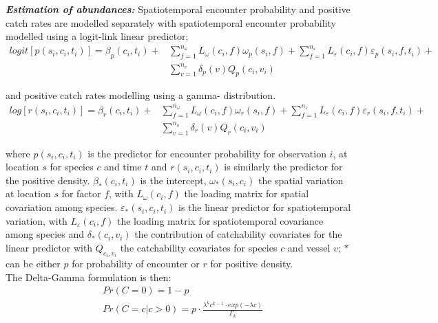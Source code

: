 \documentclass[fleqn,10pt]{wlscirep}
\begin{document}
\begin{linenumbers}
\textbf{\textit{Estimation of abundances:}} Spatiotemporal encounter
probability and positive catch rates are modelled separately with
spatiotemporal encounter probability modelled using a logit-link linear
predictor;
		\begin{equation}
			\begin{split}
			logit[p(s_{i},c_{i},t_{i})] =	\beta_{p}(c_{i},t_{i}) +
			& \sum\limits_{f=1}^{n_{\omega}} L_{\omega}(c_{i},f)
			\omega_{p}(s_{i},f) + \sum\limits_{f=1}^{n_{\varepsilon}}
			L_{\varepsilon}(c_{i},f) \varepsilon_{p}(s_{i},f,t_{i}) + \\ 
			& \sum\limits_{v=1}^{n_{v}}\delta_{p}(v)Q_{p}(c_{i}, v_{i})
		\end{split}
		\end{equation}

and positive catch rates modelling using a gamma- distribution\cite{Thorson2015a}. 
		\begin{equation}
			\begin{split}
			log[r(s_{i},c_{i},t_{i})] = \beta_{r}(c_{i},t_{i}) +
			& \sum\limits_{f=1}^{n_{\omega}} L_{\omega}(c_{i},f)
			\omega_{r}(s_{i},f) +\sum\limits_{f=1}^{n_{\varepsilon}} 
			L_{\varepsilon}(c_{i},f) \varepsilon_{r}(s_{i},f,t_{i}) + \\
			& \sum\limits_{v=1}^{n_{v}}\delta_{r}(v) Q_{r}(c_{i}, v_{i})
			\end{split}
		\end{equation}

where $p(s_{i}, c_{i}, t_{i})$ is the predictor for encounter probability for
observation $i$, at location $s$ for species $c$ and time $t$ and
$r(s_{i}, c_{i}, t_{i})$ is similarly the predictor for the positive density.
$\beta_{*}(c_{i},t_{i})$ is the intercept, $\omega_{*}(s_{i},c_{i})$ the
spatial variation at location $s$ for factor $f$, with $L_{\omega}(c_{i},f)$
the loading matrix for spatial covariation among species.
$\varepsilon_{*}(s_{i},c_{i},t_{i})$ is the linear predictor for
spatiotemporal variation, with $L_{\varepsilon}(c_{i}, f)$ the loading matrix
for spatiotemporal covariance among species and $\delta_{*}(c_{i},
v_{i})$ the contribution of catchability covariates for the linear predictor
with $Q_{c_{i}, v_{i}}$ the catchability covariates for species $c$ and
vessel $v$;  $*$ can be either $p$ for probability of encounter or $r$ for
positive density.\\

The Delta-Gamma formulation is then:
\begin{equation}
	\begin{split}
	& Pr(C = 0) = 1 - p \\
	& Pr(C = c | c > 0) = p \cdot \frac{\lambda^{k}c^{k-1} \cdot exp(-\lambda c)}{\Gamma_{k}}
	\end{split}
\end{equation}


\end{linenumbers}
\end{document}
